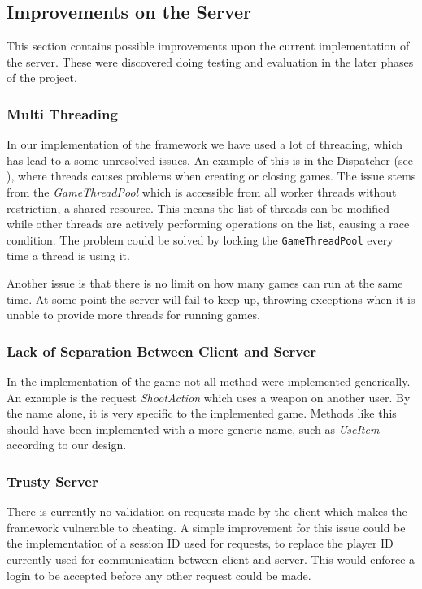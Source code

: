 \subsection{Improvements on the Server}
This section contains possible improvements upon the current implementation of the server. These were discovered doing testing and evaluation in the later phases of the project.  

\subsubsection{Multi Threading}
In our implementation of the framework we have used a lot of threading, which has lead to a some unresolved issues. An example of this is in the Dispatcher (see ), where threads causes problems when creating or closing games. The issue stems from the \textit{GameThreadPool} which is accessible from all worker threads without restriction, a shared resource. This means the list of threads can be modified while other threads are actively performing operations on the list, causing a race condition. The problem could be solved by locking the \texttt{GameThreadPool} every time a thread is using it.

Another issue is that there is no limit on how many games can run at the same time. At some point the server will fail to keep up, throwing exceptions when it is unable to provide more threads for running games.

\subsubsection{Lack of Separation Between Client and Server}
In the implementation of the game not all method were implemented generically. An example is the request \textit{ShootAction} which uses a weapon on another user. By the name alone, it is very specific to the implemented game. Methods like this should have been implemented with a more generic name, such as \textit{UseItem} according to our design.

\subsubsection{Trusty Server}
There is currently no validation on requests made by the client which makes the framework vulnerable to cheating. A simple improvement for this issue could be the implementation of a session ID used for requests, to replace the player ID currently used for communication between client and server. This would enforce a login to be accepted before any other request could be made.